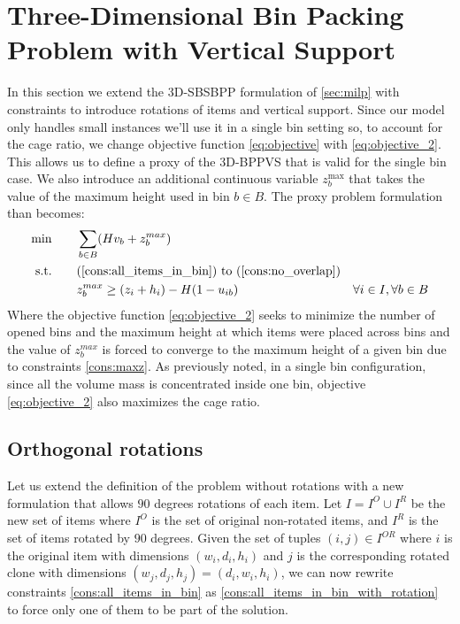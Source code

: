 \section{Three-Dimensional Bin Packing Problem with Vertical Support}
In this section we extend the 3D-SBSBPP formulation of \cref{sec:milp} with constraints to introduce rotations of items and vertical support. Since our model only handles small instances we'll use it in a single bin setting so, to account for the cage ratio, we change objective function \ref{eq:objective} with \ref{eq:objective_2}.
This allows us to define a proxy of the 3D-BPPVS that is valid for the single bin case.
We also introduce an additional continuous variable $z_b^\text{max}$ that takes the value of the maximum height used in bin $b \in B$.
The proxy problem formulation than becomes:
\begin{align}
    \min       \qquad& \sum\limits_{b \in B} (H v_b + z^{max}_b) & \label{eq:objective_2} \\
    \text{s.t.} \qquad& \text{(\ref{cons:all_items_in_bin}) to (\ref{cons:no_overlap})} \\ 
                     & z^{max}_b \ge (z_i + h_i) - H(1-u_{ib}) & \forall i \in I, \forall b \in B \label{cons:maxz}
\end{align}
Where the objective function \ref{eq:objective_2} seeks to minimize the number of opened bins and the maximum height at which items were placed across bins and the value of $z^{max}_b$ is forced to converge to the maximum height of a given bin due to constraints \ref{cons:maxz}.
As previously noted, in a single bin configuration, since all the volume mass is concentrated inside one bin, objective \ref{eq:objective_2} also maximizes the cage ratio.
\subsection*{Orthogonal rotations}
\label{subsec:orthogonal_rotations}%

Let us extend the definition of the problem without rotations with a new formulation that allows $90$ degrees rotations of each item.
Let $I = I^O \cup I^R$ be the new set of items where $I^O$ is the set of original non-rotated items, and $I^R$ is the set of items rotated by $90$ degrees.
Given the set of tuples $(i, j) \in I^{OR}$ where $i$ is the original item with dimensions $(w_i, d_i, h_i)$ and $j$ is the corresponding rotated clone with dimensions $(w_j, d_j, h_j) = (d_i, w_i, h_i)$, we can now rewrite constraints \ref{cons:all_items_in_bin} as \ref{cons:all_items_in_bin_with_rotation} to force only one of them to be part of the solution.

